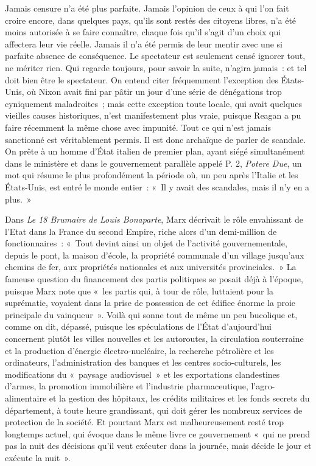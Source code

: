 \documentclass[french,twoside]{book} %
\begin{document}
Jamais censure n’a été plus parfaite. Jamais l’opinion de ceux à qui l’on fait croire encore, dans quelques pays, qu’ils sont restés des citoyens libres, n’a été moins autorisée à se faire connaître, chaque fois qu’il s’agit d’un choix qui affectera leur vie réelle. Jamais il n’a été permis de leur mentir avec une si parfaite absence de conséquence. Le spectateur est seulement censé ignorer tout, ne mériter rien. Qui regarde toujours, pour savoir la suite, n’agira jamais : et tel doit bien être le spectateur. On entend citer fréquemment l’exception des États-Unis, où Nixon avait fini par pâtir un jour d’une série de dénégations trop cyniquement maladroites ; mais cette exception toute locale, qui avait quelques vieilles causes historiques, n’est manifestement plus vraie, puisque Reagan a pu faire récemment la même chose avec impunité. Tout ce qui n’est jamais sanctionné est véritablement permis. Il est donc archaïque de parler de scandale. On prête à un homme d’État italien de premier plan, ayant siégé simultanément dans le ministère et dans le gouvernement parallèle appelé P. 2, \emph{Potere Due}, un mot qui résume le plus profondément la période où, un peu après l’Italie et les États-Unis, est entré le monde entier : « Il y avait des scandales, mais il n’y en a plus. »\par
Dans \emph{Le 18 Brumaire de Louis Bonaparte}, Marx décrivait le rôle envahissant de l’Etat dans la France du second Empire, riche alors d’un demi-million de fonctionnaires : « Tout devint ainsi un objet de l’activité gouvernementale, depuis le pont, la maison d’école, la propriété communale d’un village jusqu’aux chemins de fer, aux propriétés nationales et aux universités provinciales. » La fameuse question du financement des partis politiques se posait déjà à l’époque, puisque Marx note que « les partis qui, à tour de rôle, luttaient pour la suprématie, voyaient dans la prise de possession de cet édifice énorme la proie principale du vainqueur ». Voilà qui sonne tout de même un peu bucolique et, comme on dit, dépassé, puisque les spéculations de l’État d’aujourd’hui concernent plutôt les villes nouvelles et les autoroutes, la circulation souterraine et la production d’énergie électro-nucléaire, la recherche pétrolière et les ordinateurs, l’administration des banques et les centres socio-culturels, les modifications du « paysage audiovisuel » et les exportations clandestines d’armes, la promotion immobilière et l’industrie pharmaceutique, l’agro-alimentaire et la gestion des hôpitaux, les crédits militaires et les fonds secrets du département, à toute heure grandissant, qui doit gérer les nombreux services de protection de la société. Et pourtant Marx est malheureusement resté trop longtemps actuel, qui évoque dans le même livre ce gouvernement « qui ne prend pas la nuit des décisions qu’il veut exécuter dans la journée, mais décide le jour et exécute la nuit ».\par
\end{document}

